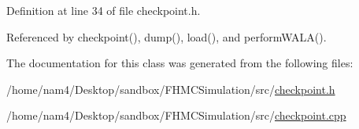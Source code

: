 Definition at line 34 of file checkpoint.\-h.



Referenced by checkpoint(), dump(), load(), and perform\-W\-A\-L\-A().



The documentation for this class was generated from the following files\-:\begin{DoxyCompactItemize}
\item 
/home/nam4/\-Desktop/sandbox/\-F\-H\-M\-C\-Simulation/src/\hyperlink{checkpoint_8h}{checkpoint.\-h}\item 
/home/nam4/\-Desktop/sandbox/\-F\-H\-M\-C\-Simulation/src/\hyperlink{checkpoint_8cpp}{checkpoint.\-cpp}\end{DoxyCompactItemize}
